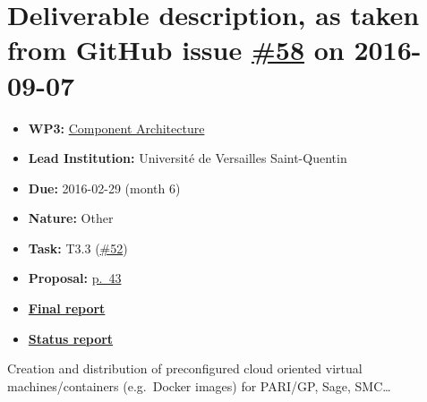 \section*{\texorpdfstring{Deliverable description, as taken from GitHub
issue
\href{https://github.com/OpenDreamKit/OpenDreamKit/issues/58}{\#58} on
2016-09-07}{Deliverable description, as taken from GitHub issue \#58 on 2016-09-07}}\label{deliverable-description-as-taken-from-github-issues-58-on-2016-09-07}

\begin{itemize}
\tightlist
\item
  \textbf{WP3:}
  \href{https://github.com/OpenDreamKit/OpenDreamKit/tree/master/WP3}{Component
  Architecture}
\item
  \textbf{Lead Institution:} Université de Versailles Saint-Quentin
\item
  \textbf{Due:} 2016-02-29 (month 6)
\item
  \textbf{Nature:} Other
\item
  \textbf{Task:} T3.3
  (\href{https://github.com/OpenDreamKit/OpenDreamKit/issues/52}{\#52})
\item
  \textbf{Proposal:}
  \href{https://github.com/OpenDreamKit/OpenDreamKit/raw/master/Proposal/proposal-www.pdf}{p.~43}
\item
  \textbf{\href{https://github.com/OpenDreamKit/OpenDreamKit/raw/master/WP3/D3.1/report-final.pdf}{Final
  report}}
\item
  \textbf{\href{https://github.com/OpenDreamKit/OpenDreamKit/wiki/D3.1-Virtual-images-and-containers}{Status
  report}}
\end{itemize}

Creation and distribution of preconfigured cloud oriented virtual
machines/containers (e.g.~Docker images) for PARI/GP, Sage, SMC\ldots{}
